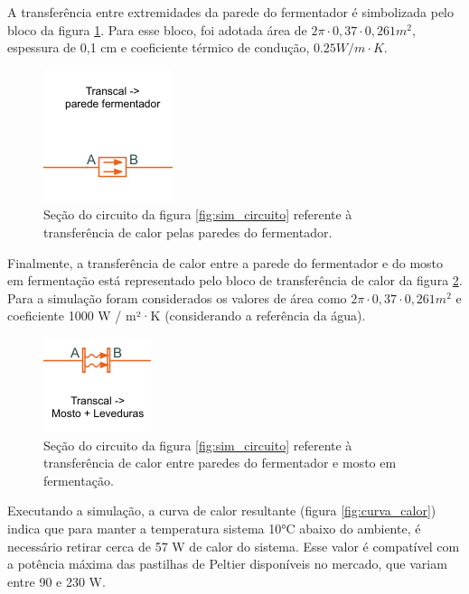 A transferência entre extremidades da parede do fermentador é simbolizada pelo bloco da figura \ref{fig:transcal_fermentador}. Para esse bloco, foi adotada área de \(2\pi \cdot 0,37 \cdot 0,261 m^2\), espessura de 0,1 cm e coeficiente térmico de condução, \(0.25 W / m \cdot K\).

\begin{figure}[H]
    \centering
    \includegraphics[scale=0.8]{figuras/projeto/controle/transcal_fermentador.png}
    \caption{Seção do circuito da figura \ref{fig:sim_circuito} referente à transferência de calor pelas paredes do fermentador.}
    \label{fig:transcal_fermentador}
\end{figure}


Finalmente, a transferência de calor entre a parede do fermentador e do mosto em fermentação está representado pelo bloco de transferência de calor da figura \ref{fig:transcal_mosto}. Para a simulação foram considerados os valores de área como \(2\pi \cdot 0,37 \cdot 0,261 m^2\) e coeficiente 1000 W / m²·K (considerando a referência da água). 

\begin{figure}[H]
    \centering
    \includegraphics[scale=0.8]{figuras/projeto/controle/transcal_mosto.png}
    \caption{Seção do circuito da figura \ref{fig:sim_circuito} referente à transferência de calor entre paredes do fermentador e mosto em fermentação.}
    \label{fig:transcal_mosto}
\end{figure}


Executando a simulação, a curva de calor resultante (figura \ref{fig:curva_calor}) indica que para manter a temperatura sistema 10°C abaixo do ambiente, é necessário retirar cerca de 57 W de calor do sistema. Esse valor é compatível com a potência máxima das pastilhas de Peltier disponíveis no mercado, que variam entre 90 e 230 W.

